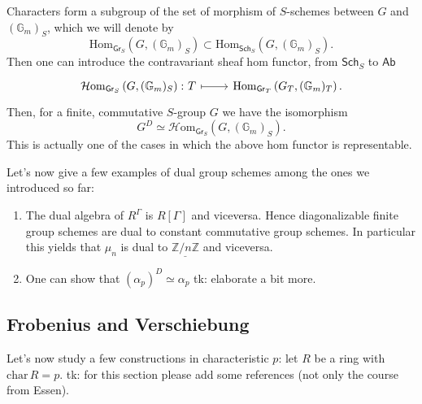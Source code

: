 \documentclass[../Main]{subfiles}
\begin{document}
\begin{rem}
	Characters form a subgroup of the set of morphism of $S$-schemes
	between $G$ and $(\mathbb{G}_m)_S$, which we will denote by
	\begin{equation*}
		\mathrm{Hom}_{\mathsf{Gr}_S} \left( G, (\mathbb{G}_m)_S \right)
		\subset
		\mathrm{Hom}_{\mathsf{Sch}_{ S }} \left( G, (\mathbb{G}_m)_S \right)
	.\end{equation*} 
	Then one can introduce the contravariant sheaf hom functor,
	from $\mathsf{Sch}_{ S }$ to $\mathsf{Ab}$
	\begin{equation*}
	\begin{tikzcd}[row sep = 0ex
		,/tikz/column 1/.append style={anchor=base east}
		,/tikz/column 2/.append style={anchor=base west}]
		\mathcal{H}\mathrm{om}_{\mathsf{Gr}_S} \left( G, (\mathbb{G}_m)_S \right)\colon
		T \arrow[r, "", mapsto] & 
		\mathrm{Hom}_{\mathsf{Gr}_T} \left( G_T, (\mathbb{G}_m)_T \right)
	.\end{tikzcd}
	\end{equation*} 
	Then, for a finite, commutative $S$-group $G$ we have the isomorphism
	\begin{equation*}
		G^D \simeq \mathcal{H}\mathrm{om}_{\mathsf{Gr}_S} \left( G, (\mathbb{G}_m)_S \right)
	.\end{equation*} 
	This is actually one of the cases in which the above hom functor
	is representable.
\end{rem}


Let's now give a few examples of dual group schemes among the ones we introduced so far:
\begin{ex}[]\leavevmode\vspace{-.2\baselineskip}
\begin{enumerate}
	\item The dual algebra of $R^\Gamma$ is $R[\Gamma]$ and viceversa.
		Hence diagonalizable finite group schemes are dual to constant commutative group schemes.
		In particular this yields that $\mu_n$ is dual to $\underline{\mathbb{Z}/n\mathbb{Z}}$
		and viceversa.

	\item One can show that $\left( \alpha_p \right)^D \simeq \alpha_p$
		tk: elaborate a bit more.
\end{enumerate}
\end{ex}


\subsection{Frobenius and Verschiebung}
Let's now study a few constructions in characteristic $p$:
let $R$ be a ring with $\mathrm{char}\, R = p$.
tk: for this section please add some references (not only the course from Essen).
\end{document}
